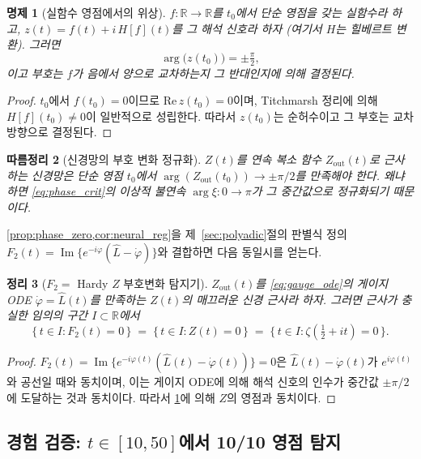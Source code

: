 \documentclass[11pt, a4paper]{article}
\theoremstyle{definition}
\theoremstyle{plain}
\newtheorem{theorem}{정리}[section]
\newtheorem{proposition}[theorem]{명제}
\newtheorem{corollary}[theorem]{따름정리}
\newcommand{\xif}{\xi}
\begin{document}
\begin{proposition}[실함수 영점에서의 위상]
\label{prop:phase_zero}
$f : \mathbb{R} \to \mathbb{R}$를 $t_0$에서 단순 영점을 갖는 실함수라 하고, $z(t) = f(t) + i\,H[f](t)$를 그 해석 신호라 하자 (여기서 $H$는 힐베르트 변환). 그러면
\[
  \arg\bigl(z(t_0)\bigr) = \pm\tfrac{\pi}{2},
\]
이고 부호는 $f$가 음에서 양으로 교차하는지 그 반대인지에 의해 결정된다.
\end{proposition}
\begin{proof}
$t_0$에서 $f(t_0)=0$이므로 $\mathrm{Re}\,z(t_0)=0$이며, Titchmarsh 정리에 의해 $H[f](t_0)\neq 0$이 일반적으로 성립한다. 따라서 $z(t_0)$는 순허수이고 그 부호는 교차 방향으로 결정된다.
\end{proof}

\begin{corollary}[신경망의 부호 변화 정규화]
\label{cor:neural_reg}
$Z(t)$를 연속 복소 함수 $Z_{\mathrm{out}}(t)$로 근사하는 신경망은 단순 영점 $t_0$에서 $\arg(Z_{\mathrm{out}}(t_0)) \to \pm\pi/2$를 만족해야 한다. 왜냐하면 \cref{eq:phase_crit}의 이상적 불연속 $\arg\xif : 0 \to \pi$가 그 중간값으로 정규화되기 때문이다.
\end{corollary}

\cref{prop:phase_zero,cor:neural_reg}을 제~\ref{sec:polyadic}절의 판별식 정의 $F_2(t) = \operatorname{Im}\{e^{-i\varphi}(\hat L - \dot\varphi)\}$와 결합하면 다음 동일시를 얻는다.

\begin{theorem}[$F_2 = $ Hardy $Z$ 부호변화 탐지기]
\label{thm:f2_hardy}
$Z_{\mathrm{out}}(t)$를 \cref{eq:gauge_ode}의 게이지 ODE $\dot\varphi = \hat L(t)$를 만족하는 $Z(t)$의 매끄러운 신경 근사라 하자. 그러면 근사가 충실한 임의의 구간 $I\subset\mathbb{R}$에서
\[
  \{\,t\in I : F_2(t)=0\,\}
  \;=\;
  \{\,t\in I : Z(t)=0\,\}
  \;=\;
  \{\,t\in I : \zeta(\tfrac{1}{2}+it)=0\,\}.
\]
\end{theorem}
\begin{proof}
$F_2(t)=\operatorname{Im}\{e^{-i\varphi(t)}(\hat L(t)-\dot\varphi(t))\}=0$은 $\hat L(t)-\dot\varphi(t)$가 $e^{i\varphi(t)}$와 공선일 때와 동치이며, 이는 게이지 ODE에 의해 해석 신호의 인수가 중간값 $\pm\pi/2$에 도달하는 것과 동치이다. 따라서 \cref{prop:phase_zero}에 의해 $Z$의 영점과 동치이다.
\end{proof}

\subsection{경험 검증: $t\in[10,50]$에서 10/10 영점 탐지}
\label{sec:f2_low}
\end{document}
